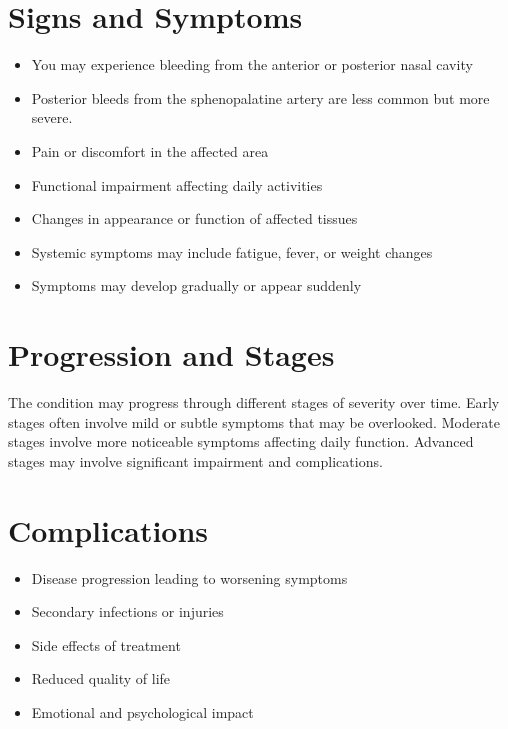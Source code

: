 \section{Signs and Symptoms}
\begin{itemize}[noitemsep]
  \item You may experience bleeding from the anterior or posterior nasal cavity
  \item Posterior bleeds from the sphenopalatine artery are less common but more severe.
  \item Pain or discomfort in the affected area
  \item Functional impairment affecting daily activities
  \item Changes in appearance or function of affected tissues
  \item Systemic symptoms may include fatigue, fever, or weight changes
  \item Symptoms may develop gradually or appear suddenly
\end{itemize}
\section{Progression and Stages}
The condition may progress through different stages of severity over time. Early stages often involve mild or subtle symptoms that may be overlooked. Moderate stages involve more noticeable symptoms affecting daily function. Advanced stages may involve significant impairment and complications.
\section{Complications}
\begin{itemize}[noitemsep]
  \item Disease progression leading to worsening symptoms
  \item Secondary infections or injuries
  \item Side effects of treatment
  \item Reduced quality of life
  \item Emotional and psychological impact
\end{itemize}
